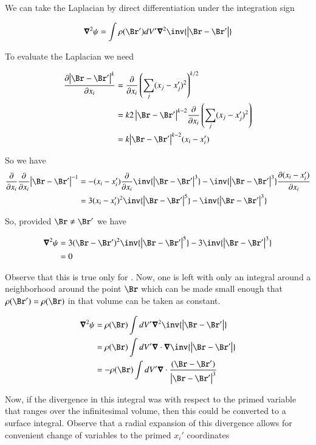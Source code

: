 We can take the Laplacian by direct differentiation under the integration sign

\begin{align*}
\spacegrad^2 \psi = \int {\rho(\Br')} dV' \spacegrad^2 \inv{\Abs{\Br - \Br'}}
\end{align*}

To evaluate the Laplacian we need

\begin{align*}
\PD{x_i}{\Abs{\Br - \Br'}^k} 
&= \PD{x_i}{} \left(\sum_j (x_j - x_j')^2 \right)^{k/2} \\
&= k { 2\Abs{\Br - \Br'}^{k-2}} \PD{x_i}{} \left(\sum_j (x_j - x_j')^2 \right) \\
&= k { \Abs{\Br - \Br'}^{k-2}} (x_i - x_i')
\end{align*}

So we have
\begin{align*}
\PD{x_i}{} \PD{x_i}{} {\Abs{\Br - \Br'}^{-1}} 
&= 
- (x_i - x_i') \PD{x_i}{}{ \inv{ \Abs{\Br - \Br'}^3} } 
- \inv{ \Abs{\Br - \Br'}^3} \PD{x_i}{ (x_i - x_i') } \\
&= 
3 (x_i - x_i')^2 { \inv{ \Abs{\Br - \Br'}^5} } 
- \inv{ \Abs{\Br - \Br'}^3} \\
\end{align*}

So, provided $\Br \ne \Br'$ we have

\begin{align*}
\spacegrad^2 \psi &= 
3 (\Br - \Br')^2 \inv{ \Abs{\Br - \Br'}^5} 
- 3 \inv{ \Abs{\Br - \Br'}^3} \\
&= 0 
\end{align*}

Observe that this is true only for .  Now, one is left with only an integral around a neighborhood around the point $\Br$ which can be made small enough that $\rho(\Br') = \rho(\Br)$ in that volume can be taken as constant.

\begin{align*}
\spacegrad^2 \psi 
&= \rho(\Br) \int dV' \spacegrad^2 \inv{\Abs{\Br - \Br'}} \\
&= \rho(\Br) \int dV' \spacegrad \cdot \spacegrad \inv{\Abs{\Br - \Br'}} \\
&= -\rho(\Br) \int dV' \spacegrad \cdot \frac{(\Br -\Br')}{\Abs{\Br - \Br'}^3} \\
\end{align*}

Now, if the divergence in this integral was with respect to the primed variable that ranges over the infinitesimal volume, then this could be converted to a surface integral.  
Observe that a radial expansion of this divergence allows for convenient change of variables to the primed $x_i'$ coordinates

